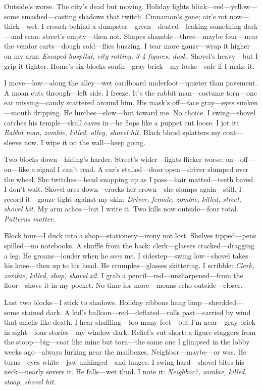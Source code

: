 \documentclass{article}
\begin{document}
Outside’s worse. The city’s dead but moving. Holiday lights blink—red—yellow—some smashed—casting shadows that twitch. Cinnamon’s gone; air’s rot now—thick—wet. I crouch behind a dumpster—green—dented—leaking something dark—and scan: street’s empty—then not. Shapes shamble—three—maybe four—near the vendor carts—dough cold—flies buzzing. I tear more gauze—wrap it higher on my arm: \textit{Escaped hospital, city rotting, 3-4 figures, dusk.} Shovel’s heavy—but I grip it tighter. Home’s six blocks south—gray brick—my locks—safe if I make it.

I move—low—along the alley—wet cardboard underfoot—quieter than pavement. A moan cuts through—left side. I freeze. It’s the rabbit man—costume torn—one ear missing—candy scattered around him. His mask’s off—face gray—eyes sunken—mouth dripping. He lurches—slow—but toward me. No choice. I swing—shovel catches his temple—skull caves in—he flops like a puppet cut loose. I jot it: \textit{Rabbit man, zombie, killed, alley, shovel hit.} Black blood splatters my coat—sleeve now. I wipe it on the wall—keep going.

Two blocks down—hiding’s harder. Street’s wider—lights flicker worse: on—off—on—like a signal I can’t read. A car’s stalled—door open—driver slumped over the wheel. She twitches—head snapping up as I pass—hair matted—teeth bared. I don’t wait. Shovel arcs down—cracks her crown—she slumps again—still. I record it—gauze tight against my skin: \textit{Driver, female, zombie, killed, street, shovel hit.} My arm aches—but I write it. Two kills now outside—four total. \textit{Patterns matter.}

Block four—I duck into a shop—stationery—irony not lost. Shelves tipped—pens spilled—no notebooks. A shuffle from the back: clerk—glasses cracked—dragging a leg. He groans—louder when he sees me. I sidestep—swing low—shovel takes his knee—then up to his head. He crumples—glasses skittering. I scribble: \textit{Clerk, zombie, killed, shop, shovel x2.} I grab a pencil—red—unsharpened—from the floor—shove it in my pocket. No time for more—moans echo outside—closer.

Last two blocks—I stick to shadows. Holiday ribbons hang limp—shredded—some stained dark. A kid’s balloon—red—deflated—rolls past—carried by wind that smells like death. I hear shuffling—too many feet—but I’m near—gray brick in sight—four stories—my window dark. Relief’s cut short: a figure staggers from the stoop—big—coat like mine but torn—the same one I glimpsed in the lobby weeks ago—always lurking near the mailboxes. Neighbor—maybe—or was. He turns—eyes white—jaw unhinged—and lunges. I swing hard—shovel bites his neck—nearly severs it. He falls—wet thud. I note it: \textit{Neighbor?, zombie, killed, stoop, shovel hit.}
\end{document}
